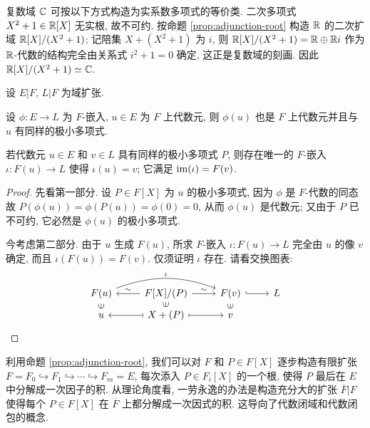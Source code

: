 \begin{example}[A.\ L.\ Cauchy, 1847]\label{eg:Cauchy-C}
	复数域 $\mathbb{C}$ 可按以下方式构造为实系数多项式的等价类. 二次多项式 $X^2+1 \in \mathbb{R}[X]$ 无实根, 故不可约. 按命题 \ref{prop:adjunction-root} 构造 $\mathbb{R}$ 的二次扩域 $\mathbb{R}[X]/(X^2+1)$; 记陪集 $X + (X^2+1)$ 为 $i$, 则 $\mathbb{R}[X]/(X^2+1) = \mathbb{R} \oplus \mathbb{R} i$ 作为 $\mathbb{R}$-代数的结构完全由关系式 $i^2 + 1=0$ 确定, 这正是复数域的刻画. 因此 $\mathbb{R}[X]/(X^2+1) \simeq \mathbb{C}$.
\end{example}

\begin{proposition}\label{prop:field-embedding}
	设 $E|F$, $L|F$ 为域扩张.
	\begin{compactenum}[(i)]
		\item 设 $\phi: E \to L$ 为 $F$-嵌入, $u \in E$ 为 $F$ 上代数元, 则 $\phi(u)$ 也是 $F$ 上代数元并且与 $u$ 有同样的极小多项式.
		\item 若代数元 $u \in E$ 和 $v \in L$ 具有同样的极小多项式 $P$, 则存在唯一的 $F$-嵌入 $\iota: F(u) \to L$ 使得 $\iota(u)=v$; 它满足 $\operatorname{im}(\iota)=F(v)$.
	\end{compactenum}
\end{proposition}
\begin{proof}
	先看第一部分. 设 $P \in F[X]$ 为 $u$ 的极小多项式, 因为 $\phi$ 是 $F$-代数的同态故 $P(\phi(u)) = \phi(P(u)) = \phi(0) =0$, 从而 $\phi(u)$ 是代数元; 又由于 $P$ 已不可约, 它必然是 $\phi(u)$ 的极小多项式.

	今考虑第二部分. 由于 $u$ 生成 $F(u)$, 所求 $F$-嵌入 $\iota: F(u) \to L$ 完全由 $u$ 的像 $v$ 确定, 而且 $\iota(F(u))=F(v)$. 仅须证明 $\iota$ 存在. 请看交换图表:
	\begin{equation*}\begin{tikzcd}[row sep=tiny]
		F(u) \arrow[bend left=20, rr, "\iota"] & F[X]/(P) \arrow[l, "\sim"'] \arrow[r, "\sim"] & F(v) \arrow[hookrightarrow, r] & L \\
		u \arrow[phantom, u, sloped, "\in" description] & X+(P) \arrow[mapsto, l] \arrow[mapsto, r] \arrow[phantom, u, sloped, "\in" description] & v \arrow[phantom, u, sloped, "\in" description] &
	\end{tikzcd}\end{equation*}
\end{proof}

利用命题 \ref{prop:adjunction-root}, 我们可以对 $F$ 和 $P \in F[X]$ 逐步构造有限扩张 $F = F_0 \hookrightarrow F_1 \hookrightarrow \cdots \hookrightarrow F_m = E$, 每次添入 $P \in F_i[X]$ 的一个根, 使得 $P$ 最后在 $E$ 中分解成一次因子的积. 从理论角度看, 一劳永逸的办法是构造充分大的扩张 $\overline{F}|F$ 使得每个 $P \in F[X]$ 在 $\overline{F}$ 上都分解成一次因式的积. 这导向了代数闭域和代数闭包的概念.

